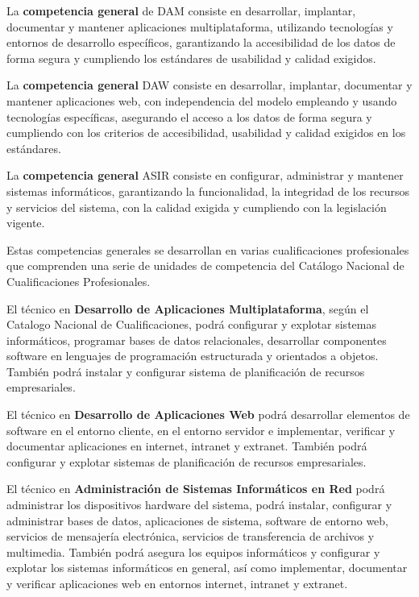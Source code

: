 La \textbf{competencia general} de DAM consiste en desarrollar, implantar, documentar y mantener aplicaciones multiplataforma, utilizando tecnologías y entornos de desarrollo específicos, garantizando la accesibilidad de los datos de forma segura y cumpliendo los estándares de usabilidad y calidad exigidos.

La \textbf{competencia general} DAW consiste en desarrollar, implantar, documentar y mantener aplicaciones web, con independencia del modelo empleando y usando tecnologías específicas, asegurando el acceso a los datos de forma segura y cumpliendo con los criterios de accesibilidad, usabilidad y calidad exigidos en los estándares.

La \textbf{competencia general} ASIR consiste en configurar, administrar y mantener sistemas informáticos, garantizando la funcionalidad, la integridad de los recursos y servicios del sistema, con la calidad exigida y cumpliendo con la legislación vigente.

Estas competencias generales se desarrollan en varias cualificaciones profesionales que comprenden una serie de unidades de competencia del Catálogo Nacional de Cualificaciones Profesionales.

El técnico en \textbf{Desarrollo de Aplicaciones Multiplataforma}, según el Catalogo Nacional de Cualificaciones, podrá configurar y explotar sistemas informáticos, programar bases de datos relacionales, desarrollar componentes software en lenguajes de programación estructurada y orientados a objetos. También podrá instalar y configurar sistema de planificación de recursos empresariales.

El técnico en \textbf{Desarrollo de Aplicaciones Web} podrá desarrollar elementos de software en el entorno cliente, en el entorno servidor e implementar, verificar y documentar aplicaciones en internet, intranet y extranet. También podrá configurar y explotar sistemas de planificación de recursos empresariales.

El técnico en \textbf{Administración de Sistemas Informáticos en Red} podrá administrar los dispositivos hardware del sistema, podrá instalar, configurar y administrar bases de datos, aplicaciones de sistema, software de entorno web, servicios de mensajería electrónica, servicios de transferencia de archivos y multimedia. También podrá asegura los equipos informáticos y configurar y explotar los sistemas informáticos en general, así como implementar, documentar y verificar aplicaciones web en entornos internet, intranet y extranet.

